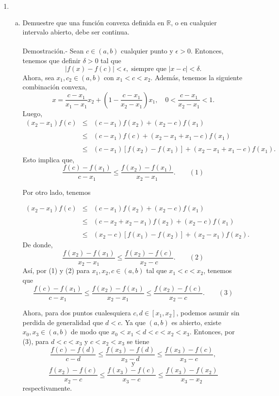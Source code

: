 \begin{enumerate}[\bfseries 1.]
\begin{enumerate}[(a)]
	\end{enumerate}


    \item
	\begin{enumerate}[a)]

	    \item Demuestre que una función convexa definida en $\mathbb{R}$, o en cualquier intervalo abierto, debe ser continua.\\\\
		Demostración.-\; Sean $c\in (a,b)$ cualquier punto y $\epsilon>0$. Entonces, tenemos que definir $\delta>0$ tal que
		$$|f(x)-f(c)|<\epsilon,\; \mbox{siempre que } |x-c|<\delta.$$
		Ahora, sea $x_1,c_2\in (a,b)$ con $x_1<c<x_2$. Además, tenemos la siguiente combinación convexa,
		$$x=\dfrac{c-x_1}{x_1-x_1}x_2+\left(1-\dfrac{c-x_1}{x_2-x_1}\right)x_1,\quad 0<\dfrac{c-x_1}{x_2-x_1}<1.$$
		Luego,
		$$
		\begin{array}{rcl}
		    (x_2-x_1)f(c)&\leq& (c-x_1)f(x_2)+(x_2-c)f(x_1)\\\\
				 &\leq& (c-x_1)f(c)+(x_2-x_1+x_1-c)f(x_1)\\\\
				 &\leq& (c-x_1)\left[f(x_2)-f(x_1)\right]+(x_2-x_1+x_1-c)f(x_1).
		\end{array}
		$$
		Esto implica que,
		$$\dfrac{f(c)-f(x_1)}{c-x_1}\leq \dfrac{f(x_2)-f(x_1)}{x_2-x_1}.\qquad (1)$$

		Por otro lado, tenemos

		$$
		\begin{array}{rcl}
		    (x_2-x_1)f(c)&\leq&(c-x_1)f(x_2) + (x_2-c)f(x_1)\\\\
				 &\leq& (c-x_2+x_2-x_1)f(x_2)+(x_2-c)f(x_1)\\\\
				 &\leq& (x_2-c)\left[f(x_1)-f(x_2)\right]+(x_2-x_1)f(x_2).
		\end{array}
		$$
		De donde,
		$$\dfrac{f(x_2)-f(x_1)}{x_2-x_1}\leq \dfrac{f(x_2)-f(c)}{x_2-c}. \qquad (2)$$
		Así, por (1) y (2) para $x_1,x_2,c\in (a,b)$ tal que $x_1<c<x_2$, tenemos que
		$$\dfrac{f(c)-f(x_1)}{c-x_1}\leq \dfrac{f(x_2)-f(x_1)}{x_2-x_1}\leq \dfrac{f(x_2)-f(c)}{x_2-c}.\qquad (3)$$

		Ahora, para dos puntos cualesquiera $c,d\in [x_1,x_2]$, podemos asumir sin perdida de generalidad que $d<c$. Ya que $(a,b)$ es abierto, existe $x_0,x_3\in(a,b)$ de modo que $x_0<x_1<d<c<x_2<x_3$. Entonces, por (3), para  $d<c<x_3$ y $c<x_2<x_3$ se tiene 
		$$\dfrac{f(c)-f(d)}{c-d}\leq \dfrac{f(x_3)-f(d)}{x_3-d}\leq \dfrac{f(x_3)-f(c)}{x_3-c},$$
		$$\mbox{y}$$
		$$\dfrac{f(x_2)-f(c)}{x_2-c}\leq \dfrac{f(x_3)-f(c)}{x_3-c}\leq \dfrac{f(x_3)-f(x_2)}{x_3-x_2}$$
		respectivamente.


\end{enumerate}
\end{enumerate}
